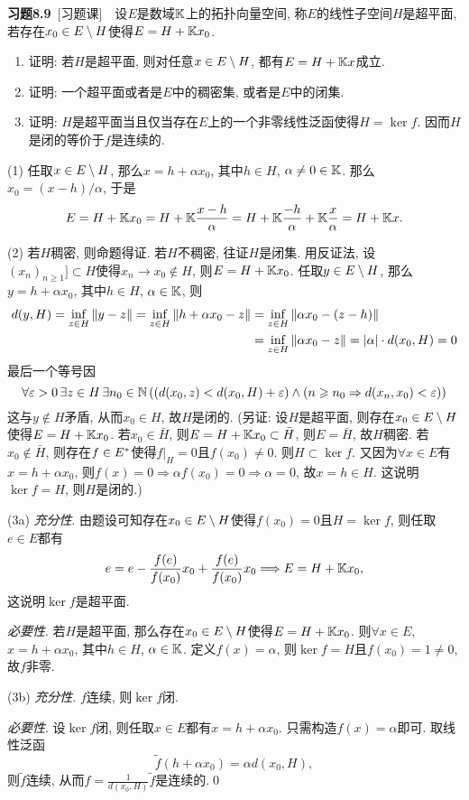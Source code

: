 	\textbf{习题8.9}\ [习题课]\ \ 设$ E $是数域$ \mathbb{K} $上的拓扑向量空间, 称$ E $的线性子空间$ H $是超平面, 若存在$ x_0\in E\setminus H $使得$ E=H+\mathbb{K} x_0 $.
	\begin{enumerate}[(1)]
	\item 证明: 若$ H $是超平面, 则对任意$ x\in E\setminus H $, 都有$ E=H+\mathbb{K} x $成立.
	\item 证明: 一个超平面或者是$ E $中的稠密集, 或者是$ E $中的闭集.
	\item 证明: $ H $是超平面当且仅当存在$ E $上的一个非零线性泛函使得$ H=\ker f $. 因而$ H $是闭的等价于$ f $是连续的.
	\end{enumerate}
	\begin{Proof}
	(1) 任取$ x\in E\setminus H $, 那么$ x=h+\alpha x_0 $, 其中$ h\in H $, $ \alpha\ne 0\in\mathbb{K} $. 那么$ x_0=(x-h)/\alpha $, 于是
	\[
	E=H+\mathbb{K} x_0=H+\mathbb{K}\frac{x-h}{\alpha}=H+\mathbb{K}\frac{-h}{\alpha}+\mathbb{K}\frac{x}{\alpha}=H+\mathbb{K} x.
	\]
	
	(2) 若$ H $稠密, 则命题得证. 若$ H $不稠密, 往证$ H $是闭集. 用反证法, 设$ (x_n)_{n\geqslant 1}]\subset H $使得$ x_n\to x_0\notin H $, 则$ E=H+\mathbb{K} x_0 $. 任取$ y\in E\setminus H $, 那么$ y=h+\alpha x_0 $, 其中$ h\in H $, $ \alpha\in\mathbb{K} $, 则
	\[
	\begin{aligned}
	d(y,H)=\inf_{z\in H}\left\| y-z \right\|=\inf_{z\in H}\left\| h+\alpha x_0-z \right\|&=\inf_{z\in H}\left\| \alpha x_0-(z-h) \right\|\\&=\inf_{z\in H}\left\| \alpha x_0-z \right\|=\left| \alpha \right| \cdot d(x_0,H)=0
	\end{aligned}
	\]
	最后一个等号因
	\[
	\forall\varepsilon>0\,\exists z\in H\,\exists n_0\in\mathbb{N}\,((d(x_0,z)<d(x_0,H)+\varepsilon)\land(n\geqslant n_0\Rightarrow d(x_n,x_0)<\varepsilon))
	\]
	这与$ y\notin H $矛盾, 从而$ x_0\in H $, 故$ H $是闭的.
	(另证: 设$ H $是超平面, 则存在$ x_0\in E\setminus H $使得$ E=H+\mathbb{K} x_0 $. 若$ x_0\in\bar{H} $, 则$ E=H+\mathbb{K} x_0\subset\bar{H} $, 则$ E=\bar{H} $, 故$ H $稠密. 若$ x_0\notin \bar{H} $, 则存在$ f\in E^{*} $使得$ f\rvert_H=0 $且$ f(x_0)\ne 0 $. 则$ H\subset\ker f $. 又因为$ \forall x\in E $有$ x=h+\alpha x_0 $, 则$ f(x)=0\Rightarrow\alpha f(x_0)=0\Rightarrow \alpha=0 $, 故$ x=h\in H $. 这说明$ \ker f=H $, 则$ H $是闭的.)
	
	(3a) \textsl{充分性}. 由题设可知存在$ x_0\in E\setminus H $使得$ f(x_0)=0 $且$ H=\ker f $, 则任取$ e\in E $都有
	\[
	e=e-\frac{f(e)}{f(x_0)}x_0+\frac{f(e)}{f(x_0)}x_0\Longrightarrow E=H+\mathbb{K} x_0,
	\]
	这说明$ \ker f $是超平面.
	
	\textsl{必要性}. 若$ H $是超平面, 那么存在$ x_0\in E\setminus H $使得$ E=H+\mathbb{K} x_0 $. 则$ \forall x\in E $, $ x=h+\alpha x_0 $, 其中$ h\in H $, $ \alpha\in\mathbb{K} $. 定义$ f(x)=\alpha $, 则$ \ker f=H $且$ f(x_0)=1\ne 0 $, 故$ f $非零.
	
	(3b) \textsl{充分性}. $ f $连续, 则$ \ker f $闭.
	
	\textsl{必要性}. 设$ \ker f $闭, 则任取$ x\in E $都有$ x=h+\alpha x_0 $. 只需构造$ f(x)=\alpha $即可. 取线性泛函
	\[
	\tilde{f}(h+\alpha x_0)=\alpha d(x_0,H),
	\]
	则$ \tilde{f} $连续, 从而$ f=\frac{1}{d(x_0,H)}\tilde{f} $是连续的.\qed
	\end{Proof}

